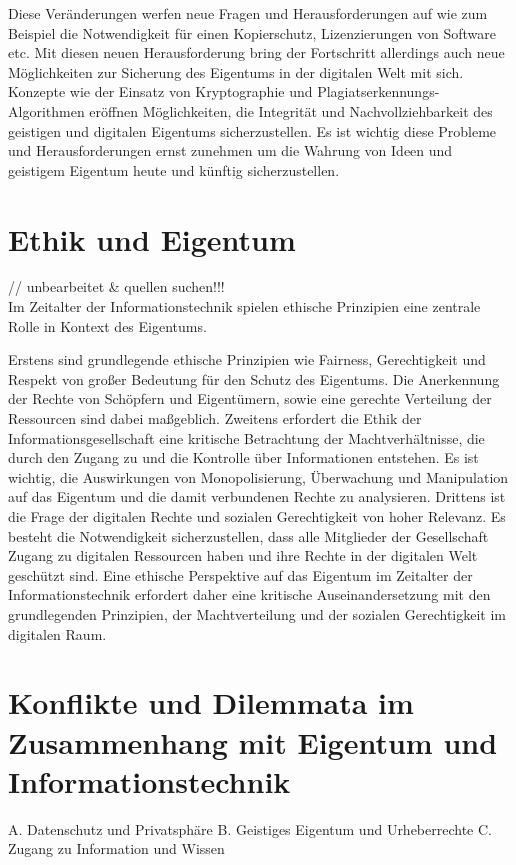 \documentclass[journal]{IEEEtran}
\begin{document}
\begin{onecolumn}
Diese Veränderungen werfen neue Fragen und Herausforderungen auf wie zum Beispiel 
die Notwendigkeit für einen Kopierschutz, Lizenzierungen von Software etc.
Mit diesen neuen Herausforderung bring der Fortschritt allerdings auch 
neue Möglichkeiten zur Sicherung des Eigentums in der digitalen Welt mit sich.
Konzepte wie der Einsatz von Kryptographie und Plagiatserkennungs-Algorithmen 
eröffnen Möglichkeiten, die Integrität und Nachvollziehbarkeit des geistigen und 
digitalen Eigentums sicherzustellen.
Es ist wichtig diese Probleme und Herausforderungen ernst zunehmen um die Wahrung von 
Ideen und geistigem Eigentum heute und künftig sicherzustellen. 

\section*{Ethik und Eigentum}
// unbearbeitet & quellen suchen!!! \\

Im Zeitalter der Informationstechnik spielen ethische Prinzipien eine zentrale Rolle in Kontext des Eigentums.

Erstens sind grundlegende ethische Prinzipien wie Fairness, Gerechtigkeit und Respekt von großer Bedeutung für den Schutz des Eigentums. Die Anerkennung der Rechte von Schöpfern und Eigentümern, sowie eine gerechte Verteilung der Ressourcen sind dabei maßgeblich. Zweitens erfordert die Ethik der Informationsgesellschaft eine kritische Betrachtung der Machtverhältnisse, die durch den Zugang zu und die Kontrolle über Informationen entstehen. Es ist wichtig, die Auswirkungen von Monopolisierung, Überwachung und Manipulation auf das Eigentum und die damit verbundenen Rechte zu analysieren. Drittens ist die Frage der digitalen Rechte und sozialen Gerechtigkeit von hoher Relevanz. Es besteht die Notwendigkeit sicherzustellen, dass alle Mitglieder der Gesellschaft Zugang zu digitalen Ressourcen haben und ihre Rechte in der digitalen Welt geschützt sind. Eine ethische Perspektive auf das Eigentum im Zeitalter der Informationstechnik erfordert daher eine kritische Auseinandersetzung mit den grundlegenden Prinzipien, der Machtverteilung und der sozialen Gerechtigkeit im digitalen Raum.

\section*{Konflikte und Dilemmata im Zusammenhang mit Eigentum und Informationstechnik}
A. Datenschutz und Privatsphäre
B. Geistiges Eigentum und Urheberrechte
C. Zugang zu Information und Wissen


\end{onecolumn}
\end{document}
